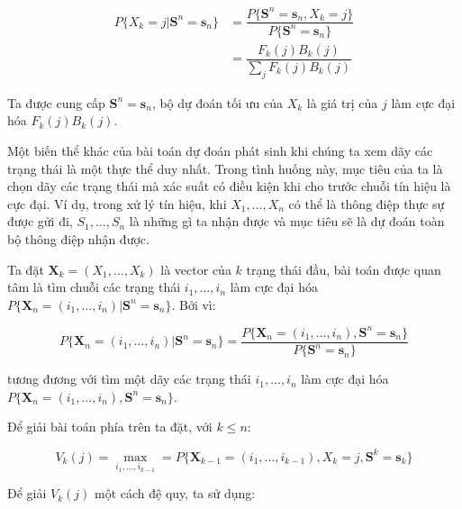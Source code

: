 \documentclass[14pt, a4paper]{article}
\numberwithin{equation}{section}
\numberwithin{figure}{section}
\theoremstyle{sltheorem}
\theoremstyle{soltheorem}
\numberwithin{dl}{section}
\numberwithin{md}{section}
\numberwithin{vd}{section}
\begin{document}
    \begin{equation*}
        \begin{aligned}
            P \lbrace X_k = j \vert \mathbf{S}^n = \mathbf{s}_n \rbrace &= \dfrac{P \lbrace \mathbf{S}^n = \mathbf{s}_n, X_k = j \rbrace}{P \lbrace \mathbf{S}^n = \mathbf{s}_n \rbrace} \\
            &= \dfrac{F_k (j) B_k (j)}{\sum_j F_k (j) B_k (j)}
        \end{aligned}
    \end{equation*}

    Ta được cung cấp $\mathbf{S}^n = \mathbf{s}_n$, bộ dự đoán tối ưu của $X_k$ là giá trị của $j$ làm cực đại hóa $F_k(j)B_k(j)$.

    Một biến thể khác của bài toán dự đoán phát sinh khi chúng ta xem dãy các trạng thái là một thực thể duy nhất.
    Trong tình huống này, mục tiêu của ta là chọn dãy các trạng thái mà xác suất có điều kiện khi cho trước chuỗi tín hiệu là cực đại.
    Ví dụ, trong xử lý tín hiệu, khi $X_1, \dots, X_n$ có thể là thông điệp thực sự được gửi đi, $S_1, \dots, S_n$ là những gì ta nhận được và mục tiêu sẽ là dự đoán toàn bộ thông điệp nhận được.

    Ta đặt $\mathbf{X}_k = (X_1, \dots, X_k)$ là vector của $k$ trạng thái đầu, bài toán được quan tâm là tìm chuỗi các trạng thái $i_1, \dots, i_n$ làm cực đại hóa $P \lbrace \mathbf{X}_n = (i_1, \dots, i_n) \vert \mathbf{S}^n = \mathbf{s}_n \rbrace$.
    Bởi vì:

    \begin{equation*}
        P \lbrace \mathbf{X}_n = (i_1, \dots, i_n) \vert \mathbf{S}^n = \mathbf{s}_n \rbrace = \dfrac{P \lbrace \mathbf{X}_n = (i_1, \dots, i_n), \mathbf{S}^n = \mathbf{s}_n \rbrace}{P \lbrace \mathbf{S}^n = \mathbf{s}_n \rbrace}
    \end{equation*}

    tương đương với tìm một dãy các trạng thái $i_1, \dots, i_n$ làm cực đại hóa $P \lbrace \mathbf{X}_n = (i_1, \dots, i_n), \mathbf{S}^n = \mathbf{s}_n \rbrace$.

    Để giải bài toán phía trên ta đặt, với $k \leq n$:

    \begin{equation*}
        V_k(j) = \max_{i_1, \dots, i_{k-1}} = P \lbrace \mathbf{X}_{k-1} = (i_1, \dots, i_{k-1}), X_k = j, \mathbf{S}^k = \mathbf{s}_k \rbrace
    \end{equation*}

    Để giải $V_k(j)$ một cách đệ quy, ta sử dụng:
\end{document}
